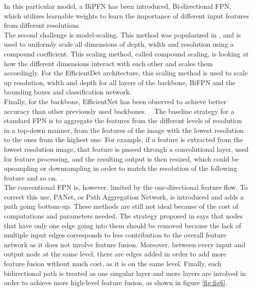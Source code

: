 In this particular model, a BiPFN has been introduced, Bi-directional FPN, which utilizes learnable weights to learn the importance of different input features from different resolutions.\\
The second challenge is model-scaling. This method was popularized in \cite{carte10}, and is used to uniformly scale all dimensions of depth, width and resolution using a compound coefficient. This scaling method, called compound scaling, is looking at how the different dimensions interact with each other and scales them accordingly. For the EfficientDet architecture, this scaling method is used to scale up resolution, width and depth for all layers of the backbone, BiFPN and the bounding boxes and classification network.\\
Finally, for the backbone, EfficientNet has been observed to achieve better accuracy than other previously used backbones. ~\cite{carte8}
The baseline strategy for a standard FPN is to aggregate the features from the different levels of resolution in a top-down manner, from the features of the image with the lowest resolution to the ones from the highest one. For example, if a feature is extracted from the lowest resolution image, that feature is passed through a convolutional layer, used for feature processing, and the resulting output is then resized, which could be upsampling or downsampling in order to match the resolution of the following feature and so on.~\cite{carte8}.\\
The conventional FPN is, however, limited by the one-directional feature flow. To correct this use, PANet, or Path Aggregation Network, is introduced and adds a path going bottom-up. These methods are still not ideal because of the cost of computations and parameters needed. The strategy proposed in \cite{carte8} says that nodes that have only one edge going into them should be removed because the lack of multiple input edges corresponds to less contribution to the overall feature network as it does not involve feature fusion. Moreover, between every input and output node at the same level, there are edges added in order to add more feature fusion without much cost, as it is on the same level. Finally, each bidirectional path is treated as one singular layer and more layers are involved in order to achieve more high-level feature fusion, as shown in figure \ref{fig:fig6}.\\
